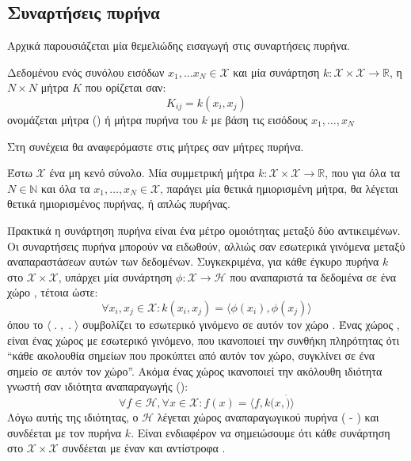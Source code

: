 \subsection{Συναρτήσεις πυρήνα}
Αρχικά παρουσιάζεται μία θεμελιώδης εισαγωγή στις συναρτήσεις πυρήνα.
\begin{definition}
Δεδομένου ενός συνόλου εισόδων $x_{1}, \dots x_{N} \in \mathcal{X}$ και μία συνάρτηση $k:\mathcal{X}\times\mathcal{X}\rightarrow \mathbb{R}$, η $N \times N$ μήτρα $K$ που ορίζεται σαν:
$$K_{ij} = k(x_{i}, x_{j}) $$
ονομάζεται  μήτρα () ή μήτρα πυρήνα του $k$ με βάση τις εισόδους $x_{1}, \dots, x_{N}$
\label{def:kernel_matrix}
\end{definition}
Στη συνέχεια θα αναφερόμαστε στις μήτρες  σαν μήτρες πυρήνα.
\begin{definition}
Έστω $\mathcal{X}$ ένα μη κενό σύνολο.
Μία συμμετρική μήτρα $k:\mathcal{X} \times \mathcal{X} \rightarrow \mathbb{R}$, που για όλα τα $N \in \mathbb{N}$ και όλα τα $x_{1},\dots, x_{N} \in \mathcal{X}$, παράγει μία θετικά ημιορισμένη μήτρα, θα λέγεται θετικά ημιορισμένος πυρήνας, ή απλώς πυρήνας.
\label{def:psd_km}
\end{definition}
Πρακτικά η συνάρτηση πυρήνα είναι ένα μέτρο ομοιότητας μεταξύ δύο αντικειμένων.
Οι συναρτήσεις πυρήνα μπορούν να ειδωθούν, αλλιώς σαν εσωτερικά γινόμενα μεταξύ αναπαραστάσεων αυτών των δεδομένων.
Συγκεκριμένα, για κάθε έγκυρο πυρήνα $k$ στο $\mathcal{X}\times\mathcal{X}$, υπάρχει μία συνάρτηση $\phi: \mathcal{X} \rightarrow \mathcal{H}$ που αναπαριστά τα δεδομένα σε ένα χώρο , τέτοια ώστε:
\begin{equation}
\forall x_{i}, x_{j} \in \mathcal{X}: k(x_{i}, x_{j}) = \langle \phi(x_{i}), \phi(x_{j}) \rangle
\end{equation}
όπου το $\langle\;.\;,\;.\;\rangle$ συμβολίζει το εσωτερικό γινόμενο σε αυτόν τον χώρο .
Ένας χώρος , είναι ένας χώρος με εσωτερικό γινόμενο, που ικανοποιεί την συνθήκη πληρότητας ότι ``κάθε ακολουθία σημείων  που προκύπτει από αυτόν τον χώρο, συγκλίνει σε ένα σημείο σε αυτόν τον χώρο''. Ακόμα ένας χώρος  ικανοποιεί την ακόλουθη ιδιότητα γνωστή σαν ιδιότητα αναπαραγωγής ():
\begin{equation}
\forall f \in \mathcal{H}, \forall x \in \mathcal{X}: f(x)=\langle f, k(x,\dot)\rangle
\end{equation}
Λόγω αυτής της ιδιότητας, ο $\mathcal{H}$ λέγεται χώρος  αναπαραγωγικού πυρήνα ( - ) και συνδέεται με τον πυρήνα $k$.
Είναι ενδιαφέρον να σημειώσουμε ότι κάθε συνάρτηση στο $\mathcal{X} \times \mathcal{X}$ συνδέεται με έναν  και αντίστροφα \cite{Aronszajn1950}.

